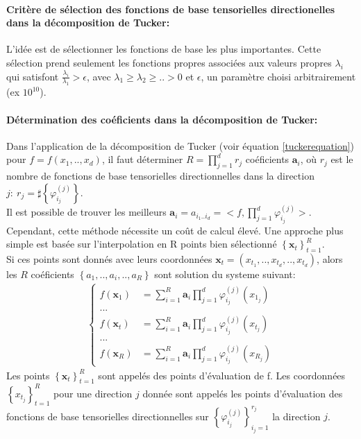 \paragraph{Critère de sélection des fonctions de base tensorielles directionelles dans la décomposition de Tucker:\\}
\hspace{0.5cm} L'idée est de sélectionner les fonctions de base les plus importantes. Cette sélection prend seulement les fonctions propres associées aux valeurs propres $\lambda_i$ qui satisfont $\frac{\lambda_i}{\lambda_1}>\epsilon$, avec $\lambda_1 \geq \lambda_2 \geq .. > 0$ et $\epsilon$, un paramètre choisi arbitrairement (ex $10^{10}$).

\paragraph{Détermination des coéficients dans la décomposition de Tucker:\\}
\hspace{0.5cm} Dans l'application de la décomposition de Tucker (voir équation \ref{tuckerequation}) pour $f = f(x_1,..,x_d)$, il faut déterminer $R = \prod_{j=1}^d r_j$ coéficients $\mathbf{a}_i$, où $r_j$ est le nombre de fonctions de base tensorielles directionnelles dans la direction $j:\ r_j = \sharp\left \{ \varphi_{i_j}^{(j)} \right \}$.\\
Il est possible de trouver les meilleurs $\mathbf{a}_i = a_{i_1..i_d} = <f, \prod_{j=1}^d \varphi_{i_j}^{(j)}>$. Cependant, cette méthode nécessite un coût de calcul élevé. Une approche plus simple est basée sur l'interpolation en R points bien sélectionné $\left \{ \mathbf{x}_t \right \}_{t=1}^R$.\\
Si ces points sont donnés avec leurs coordonnées $\mathbf{x}_t = (x_{t_1}, .., x_{t_d}, .., x_{t_d})$, alors les $R$ coéficients $\left \{a_1,.., a_i,..,a_R \right \}$ sont solution du systeme suivant:
\begin{align}
		\left\{\begin{matrix}
		f(\mathbf{x}_1) & = \sum_{i=1}^R \mathbf{a}_i \prod_{j=1}^d \varphi_{i_j}^{(j)} (x_{1_j})\\
		 ... \\
		f(\mathbf{x}_t) & = \sum_{i=1}^R \mathbf{a}_i \prod_{j=1}^d \varphi_{i_j}^{(j)} (x_{t_j})\\
		 ... \\
		f(\mathbf{x}_R) & = \sum_{i=1}^R \mathbf{a}_i \prod_{j=1}^d \varphi_{i_j}^{(j)} (x_{R_j})
		\end{matrix}\right.
		\label{longtuckerequation}
\end{align}
Les points $\left \{ \mathbf{x}_t \right \}_{t=1}^R$ sont appelés des points d'évaluation de f. Les coordonnées $\left \{ x_{t_j} \right \}_{t=1}^R$ pour une direction $j$ donnée sont appelés les points d'évaluation des fonctions de base tensorielles directionnelles sur $\left \{ \varphi_{i_j}^{(j)} \right \}_{i_j=1}^{r_j}$ la direction $j$.

